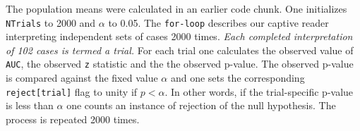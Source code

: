 \documentclass[
]{book}
\newenvironment{Shaded}{\begin{snugshade}}{\end{snugshade}}
\newcommand{\CharTok}[1]{\textcolor[rgb]{0.31,0.60,0.02}{#1}}
\newcommand{\CommentTok}[1]{\textcolor[rgb]{0.56,0.35,0.01}{\textit{#1}}}
\newcommand{\DataTypeTok}[1]{\textcolor[rgb]{0.13,0.29,0.53}{#1}}
\newcommand{\DecValTok}[1]{\textcolor[rgb]{0.00,0.00,0.81}{#1}}
\newcommand{\KeywordTok}[1]{\textcolor[rgb]{0.13,0.29,0.53}{\textbf{#1}}}
\newcommand{\NormalTok}[1]{#1}
\newcommand{\OperatorTok}[1]{\textcolor[rgb]{0.81,0.36,0.00}{\textbf{#1}}}
\newcommand{\StringTok}[1]{\textcolor[rgb]{0.31,0.60,0.02}{#1}}
\begin{document}
\begin{Shaded}
\end{Shaded}

The population means were calculated in an earlier code chunk. One initializes \texttt{NTrials} to 2000 and \(\alpha\) to 0.05. The \texttt{for-loop} describes our captive reader interpreting independent sets of cases 2000 times. \emph{Each completed interpretation of 102 cases is termed a trial.} For each trial one calculates the observed value of \texttt{AUC}, the observed \texttt{z} statistic and the the observed p-value. The observed p-value is compared against the fixed value \(\alpha\) and one sets the corresponding \texttt{reject{[}trial{]}} flag to unity if \(p < \alpha\). In other words, if the trial-specific p-value is less than \(\alpha\) one counts an instance of rejection of the null hypothesis. The process is repeated 2000 times.
\end{document}
